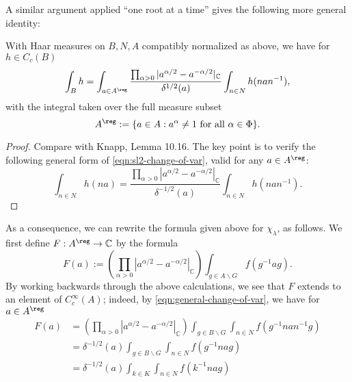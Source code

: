 \documentclass[reqno]{amsart} 
\begin{document}
A similar argument applied ``one root at a time'' gives the following more general identity:
\begin{lemma}\label{lem:change-variables-N-A}
  With Haar measures on $B,N,A$ compatibly normalized as above, we have for $h \in C_c(B)$
  \begin{equation}\label{eqn:}
    \int_B
    h
    =
    \int_{a \in A^{\reg}}
    \frac{\prod _{\alpha > 0}  | a^{\alpha/2} -  a^{-\alpha/2}
      |_{\mathbb{C}}}
    {
      \delta^{1/2}(a)
    }
    \int_{n \in N}
    h (n a n^{-1}),
  \end{equation}
  with the integral taken over the full measure subset
  \begin{equation}\label{eqn:}
    A^{\reg}  := \{a \in A : a^\alpha \neq 1 \text{ for all }
    \alpha \in \Phi\}.
  \end{equation}
\end{lemma}
\begin{proof}
  Compare with Knapp, Lemma 10.16.  The key point is to verify the following general form of \eqref{eqn:sl2-change-of-var}, valid for any $a \in A^{\reg}$:
  \begin{equation}\label{eqn:general-change-of-var}
    \int_{n \in N}
    h (n a)
    =
    \frac {
      \prod_{\alpha > 0}
      |a^{\alpha/2} - a^{-\alpha/2}|_{\mathbb{C}}
    }
    {
      \delta^{-1/2}(a)
    }
    \int_{n \in N}
    h (n a n^{-1}).
  \end{equation}  
\end{proof}
As a consequence, we can rewrite the formula given above for $\chi_\lambda$, as follows.  We first define $F : A^{\reg} \rightarrow \mathbb{C}$ by the formula
\begin{equation}\label{eqn:formula-for-F-on-regular-a}
  F(a) :=
  (\prod_{\alpha > 0}
  |a^{\alpha/2} - a^{-\alpha/2}|_{\mathbb{C}})
  \int_{g \in A \backslash G}
  f(g^{-1} a g).
\end{equation}
By working backwards through the above calculations, we see that $F$ extends to an element of $C_c^\infty(A)$; indeed, by \eqref{eqn:general-change-of-var}, we have for $a \in A^{\reg}$
\begin{align*}
  F(a)
  &=
    (\prod_{\alpha > 0}
    |a^{\alpha/2} - a^{-\alpha/2}|_{\mathbb{C}})
    \int_{g \in B \backslash G}
    \int_{n \in N}
    f(g^{-1} n a n^{-1} g)
  \\
  &=
    \delta^{-1/2}(a)
    \int_{g \in B \backslash G}
    \int_{n \in N}
    f(g^{-1} n a g)
  \\
  &=
    \delta^{-1/2}(a)
    \int_{k \in K}
    \int_{n \in N}
    f(k^{-1} n a g)
\end{align*}
\end{document}
